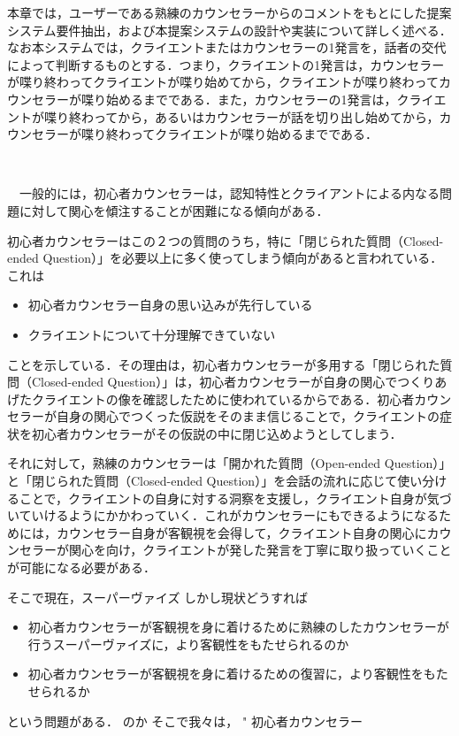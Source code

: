 \documentclass[shuuron]{kuee}
\begin{document}
本章では，ユーザーである熟練のカウンセラーからのコメントをもとにした提案システム要件抽出，および本提案システムの設計や実装について詳しく述べる．なお本システムでは，クライエントまたはカウンセラーの1発言を，話者の交代によって判断するものとする．つまり，クライエントの1発言は，カウンセラーが喋り終わってクライエントが喋り始めてから，クライエントが喋り終わってカウンセラーが喋り始めるまでである．また，カウンセラーの1発言は，クライエントが喋り終わってから，あるいはカウンセラーが話を切り出し始めてから，カウンセラーが喋り終わってクライエントが喋り始めるまでである．


　　　　　　　　　　　　　　　　　　　　　　　　　　　　　　　　　　　　　　　　　　　　　　　　　　　　　　　　　　　　　　　　　　　　　　　　　　　　

　一般的には，初心者カウンセラーは，認知特性とクライアントによる内なる問題に対して関心を傾注することが困難になる傾向がある．

初心者カウンセラーはこの２つの質問のうち，特に「閉じられた質問（Closed-ended Question）」を必要以上に多く使ってしまう傾向があると言われている．これは

\begin{itemize}
\item 初心者カウンセラー自身の思い込みが先行している
\item クライエントについて十分理解できていない
\end{itemize}
ことを示している．その理由は，初心者カウンセラーが多用する「閉じられた質問（Closed-ended Question）」は，初心者カウンセラーが自身の関心でつくりあげたクライエントの像を確認したために使われているからである．初心者カウンセラーが自身の関心でつくった仮説をそのまま信じることで，クライエントの症状を初心者カウンセラーがその仮説の中に閉じ込めようとしてしまう．

それに対して，熟練のカウンセラーは「開かれた質問（Open-ended Question）」と「閉じられた質問（Closed-ended Question）」を会話の流れに応じて使い分けることで，クライエントの自身に対する洞察を支援し，クライエント自身が気づいていけるようにかかわっていく．これがカウンセラーにもできるようになるためには，カウンセラー自身が客観視を会得して，クライエント自身の関心にカウンセラーが関心を向け，クライエントが発した発言を丁寧に取り扱っていくことが可能になる必要がある．

そこで現在，スーパーヴァイズ
しかし現状どうすれば
\begin{itemize}
\item 初心者カウンセラーが客観視を身に着けるために熟練のしたカウンセラーが行うスーパーヴァイズに，より客観性をもたせられるのか
\item 初心者カウンセラーが客観視を身に着けるための復習に，より客観性をもたせられるか
\end{itemize}
という問題がある．
のか
そこで我々は，
"	初心者カウンセラー
\end{document}
